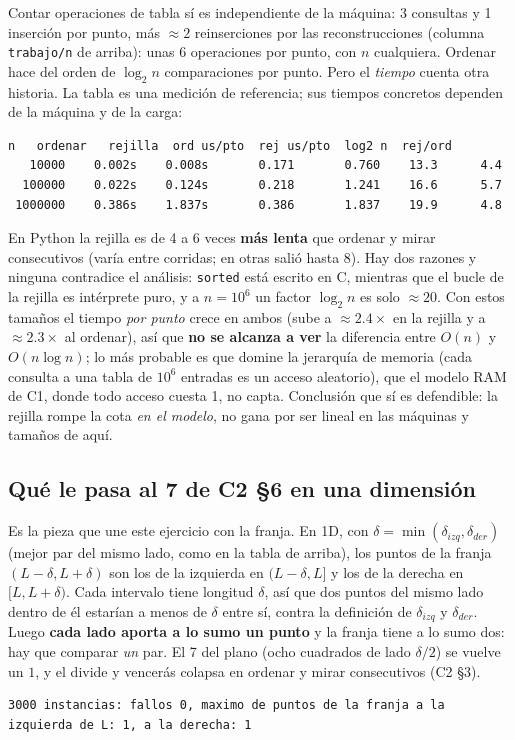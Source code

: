 \documentclass[11pt]{article}
\begin{document}
Contar operaciones de tabla sí es independiente de la máquina: 3 consultas y 1 inserción por punto, más
$\approx2$ reinserciones por las reconstrucciones (columna \texttt{trabajo/n} de arriba): unas 6 operaciones
por punto, con $n$ cualquiera. Ordenar hace del orden de $\log_2 n$ comparaciones por punto. Pero el
\emph{tiempo} cuenta otra historia. La tabla es una medición de referencia; sus tiempos concretos dependen de la
máquina y de la carga:
\begin{lstlisting}[style=salida,basicstyle=\ttfamily\footnotesize\color{black}]
       n   ordenar   rejilla  ord us/pto  rej us/pto  log2 n  rej/ord
   10000    0.002s    0.008s       0.171       0.760    13.3      4.4
  100000    0.022s    0.124s       0.218       1.241    16.6      5.7
 1000000    0.386s    1.837s       0.386       1.837    19.9      4.8
\end{lstlisting}
En Python la rejilla es de 4 a 6 veces \textbf{más lenta} que ordenar y mirar consecutivos (varía entre
corridas; en otras salió hasta 8). Hay dos razones y ninguna contradice el análisis: \texttt{sorted} está
escrito en C, mientras que el bucle de la rejilla es intérprete puro, y a $n=10^6$ un factor $\log_2 n$
es solo $\approx20$. Con estos tamaños el tiempo \emph{por punto} crece en ambos (sube a $\approx2.4\times$
en la rejilla y a $\approx2.3\times$ al ordenar), así que \textbf{no se alcanza a ver} la diferencia entre
$O(n)$ y $O(n\log n)$; lo más probable es que domine la jerarquía de memoria (cada consulta a una tabla de
$10^6$ entradas es un acceso aleatorio), que el modelo RAM de C1, donde todo acceso cuesta 1, no capta.
Conclusión que sí es defendible: la rejilla rompe la cota \emph{en el modelo}, no gana por ser lineal en
las máquinas y tamaños de aquí.

\subsection{Qué le pasa al 7 de C2 §6 en una dimensión}

Es la pieza que une este ejercicio con la franja. En 1D, con $\delta=\min(\delta_{izq},\delta_{der})$ (mejor
par del mismo lado, como en la tabla de arriba), los puntos de la franja $(L-\delta,L+\delta)$ son los de la
izquierda en $(L-\delta,L]$ y los de la derecha en $[L,L+\delta)$. Cada intervalo tiene longitud $\delta$,
así que dos puntos del mismo lado dentro de él estarían a menos de $\delta$ entre sí, contra la
definición de $\delta_{izq}$ y $\delta_{der}$. Luego \textbf{cada lado aporta a lo sumo un punto} y la franja
tiene a lo sumo dos: hay que comparar \emph{un} par. El 7 del plano (ocho cuadrados de lado $\delta/2$)
se vuelve un $1$, y el divide y vencerás colapsa en ordenar y mirar consecutivos (C2 §3).
\begin{lstlisting}[style=salida,basicstyle=\ttfamily\footnotesize\color{black}]
3000 instancias: fallos 0, maximo de puntos de la franja a la izquierda de L: 1, a la derecha: 1
\end{lstlisting}
\end{document}
